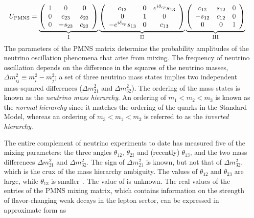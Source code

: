 \begin{equation}
U_{\rm PMNS} = 
  \underbrace{
    \left( \begin{array}{ccc}
        1 & 0 & 0 \\ 
        0 & c_{23} & s_{23} \\ 
        0 & -s_{23} & c_{23}
    \end{array} \right)
  }_{\rm I}
\underbrace{
  \left( \begin{array}{ccc}
      c_{13} & 0 & e^{i\delta_{cp}}s_{13} \\ 
      0 & 1 & 0 \\ 
      -e^{i\delta_{cp}}s_{13} & 0 & c_{13}
  \end{array} \right) 
}_{\rm II}
\underbrace{
 \left( \begin{array}{ccc}
      c_{12} & s_{12} & 0 \\ 
      -s_{12} & c_{12} & 0 \\ 
      0 & 0 & 1
  \end{array} \right) 
}_{\rm III}
\label{eqn:pmns}
\end{equation}
The parameters of the PMNS
matrix determine the probability amplitudes of the neutrino
oscillation phenomena that arise from mixing.  The frequency of neutrino oscillation 
depends on the difference in the squares of the neutrino
masses, $\Delta m^{2}_{ij} \equiv m^{2}_{i} - m^{2}_{j}$; a set of three
neutrino mass states implies two independent mass-squared differences
($\Delta m^{2}_{21}$ and $\Delta m^{2}_{32}$). The ordering of the
mass states is known as the \emph{neutrino mass hierarchy}. An ordering of
$m_1 < m_2 < m_3$ is known as the \emph{normal hierarchy} since it matches
the ordering of the quarks in the Standard Model, whereas an ordering of $m_3 < m_1 < m_2$
is referred to as the \emph{inverted hierarchy}.

The entire complement of neutrino experiments to date has measured
five of the mixing parameters: the three angles $\theta_{12}$,
$\theta_{23}$ and (recently) $\theta_{13}$, and the two mass differences
$\Delta m^{2}_{21}$ and $\Delta m^{2}_{32}$. The sign of $\Delta
m^{2}_{21}$ is known, but not that of $\Delta m^{2}_{32}$, which 
is the crux of the 
mass hierarchy ambiguity.
The values of $\theta_{12}$ and $\theta_{23}$ are large, while 
$\theta_{13}$ is smaller~\cite{An:2012bu}. The value of \deltacp is unknown.
The real values of the entries of the PMNS mixing matrix, which
contains information on the strength of flavor-changing weak decays in
the lepton sector, can be expressed in approximate form as

